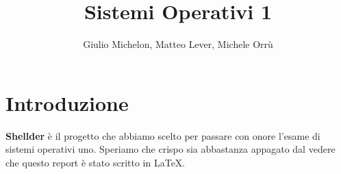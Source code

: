 \documentclass[11pt]{article}
\title{\textbf{Sistemi Operativi 1}}
\author{Giulio Michelon, Matteo Lever, Michele Orr\`u\\
}
\date{}
\begin{document}
\maketitle

\section{Introduzione}

\textbf{Shellder} \`e il progetto che abbiamo scelto per passare con onore l'esame di sistemi operativi uno. Speriamo che crispo sia abbastanza appagato dal vedere che questo report \`e stato scritto in
 \LaTeX .
\end{document}

